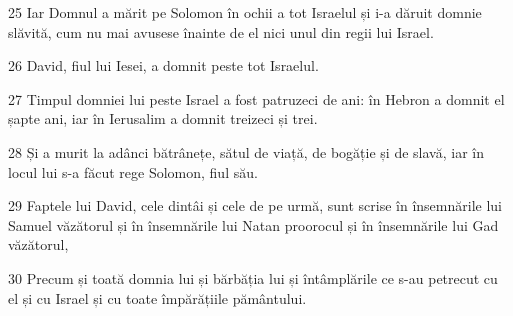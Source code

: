\par 25 Iar Domnul a mărit pe Solomon în ochii a tot Israelul și i-a dăruit domnie slăvită, cum nu mai avusese înainte de el nici unul din regii lui Israel.
\par 26 David, fiul lui Iesei, a domnit peste tot Israelul.
\par 27 Timpul domniei lui peste Israel a fost patruzeci de ani: în Hebron a domnit el șapte ani, iar în Ierusalim a domnit treizeci și trei.
\par 28 Și a murit la adânci bătrânețe, sătul de viață, de bogăție și de slavă, iar în locul lui s-a făcut rege Solomon, fiul său.
\par 29 Faptele lui David, cele dintâi și cele de pe urmă, sunt scrise în însemnările lui Samuel văzătorul și în însemnările lui Natan proorocul și în însemnările lui Gad văzătorul,
\par 30 Precum și toată domnia lui și bărbăția lui și întâmplările ce s-au petrecut cu el și cu Israel și cu toate împărățiile pământului.


